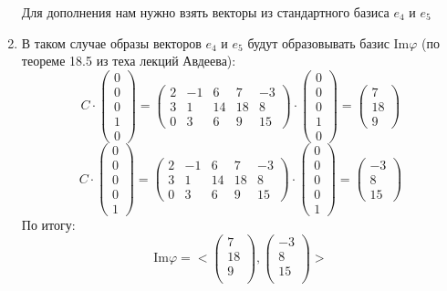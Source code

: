 \documentclass[a4paper,12pt]{article}
\begin{document}
\begin{enumerate}
Для дополнения нам нужно взять векторы из стандартного базиса $e_4$ и $e_5$
\item В таком случае образы векторов $e_4$ и $e_5$ будут образовывать базис $\text{Im} \varphi$ (по теореме 18.5 из теха лекций Авдеева):
\[
C \cdot \begin{pmatrix}
 0\\ 0 \\ 0\\1\\0
\end{pmatrix}
=
\begin{pmatrix}
2 & -1 & 6 & 7 & -3 \\
3 & 1 & 14 & 18 & 8 \\
0 & 3 & 6 & 9 & 15
\end{pmatrix}
\cdot
\begin{pmatrix}
0\\ 0 \\ 0\\1\\0
\end{pmatrix}
=
\left(\begin{matrix}
7\\
18\\
9
\end{matrix}\right)
\]
\[
C \cdot \begin{pmatrix}
0 \\ 0\\ 0\\0\\1
\end{pmatrix}
=
\begin{pmatrix}
2 & -1 & 6 & 7 & -3 \\
3 & 1 & 14 & 18 & 8 \\
0 & 3 & 6 & 9 & 15
\end{pmatrix}
\cdot
\begin{pmatrix}
0 \\ 0\\ 0\\0\\1
\end{pmatrix}
=
\left(\begin{matrix}
-3 \\
8 \\
15
\end{matrix}\right)
\]
По итогу:
\[
\text{Im} \varphi = 
<
\left(\begin{matrix}
7\\
18 \\
9\\
\end{matrix}\right)
,
\left(\begin{matrix}
-3\\
8\\
15 \\
\end{matrix}\right)
>
\]
\end{enumerate}
\end{document}
